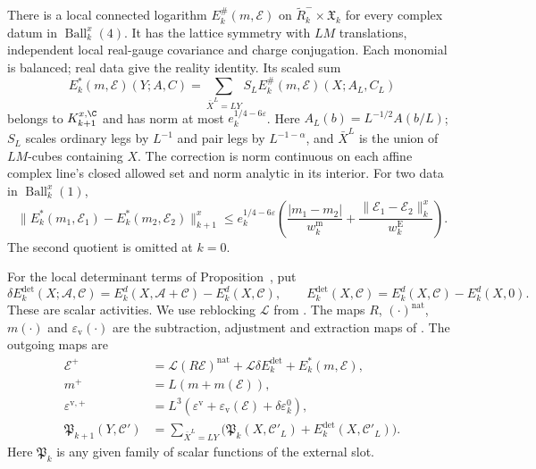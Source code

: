 \begin{theorem}
\begin{enumerate}[label=\textup{(\roman*)},leftmargin=*]
\end{enumerate}

There is a local connected logarithm $E_k^\#(m,\mathscr E)$ on
$\widetilde R_k^-\times\mathfrak X_k$ for every complex datum in
$\operatorname{Ball}_k^x(4)$. It has the lattice symmetry with
$LM$ translations, independent local real-gauge covariance and
charge conjugation. Each monomial is balanced; real data give the
reality identity. Its scaled sum
\[
 E_k^*(m,\mathscr E)(Y;A,C)
   =\sum_{\bar X^L=LY}S_LE_k^\#(m,\mathscr E)(X;A_L,C_L)
\]
belongs to $K_{k+1}^{x,\C}$ and has norm at most
$e_k^{1/4-6\varepsilon}$. Here $A_L(b)=L^{-1/2}A(b/L)$;
$S_L$ scales ordinary legs by $L^{-1}$ and pair legs by
$L^{-1-\alpha}$, and $\bar X^L$ is the union of $LM$-cubes
containing $X$. The correction is norm continuous on each affine
complex line's closed allowed set and norm analytic in its interior.
For two data in $\operatorname{Ball}_k^x(1)$,
\[
 \|E_k^*(m_1,\mathscr E_1)-E_k^*(m_2,\mathscr E_2)\|_{k+1}^x
 \le e_k^{1/4-6\varepsilon}
 \left(\frac{|m_1-m_2|}{w_k^{\mathrm m}}+
       \frac{\|\mathscr E_1-\mathscr E_2\|_k^x}{w_k^{\mathrm E}}\right).
\]
The second quotient is omitted at $k=0$.

For the local determinant terms of
Proposition~, put
\[
 \delta E_k^{\mathrm{det}}(X;\mathscr A,\mathscr C)
       =E_k^d(X,\mathscr A+\mathscr C)-E_k^d(X,\mathscr C),
 \qquad
 E_k^{\mathrm{det}}(X,\mathscr C)
       =E_k^d(X,\mathscr C)-E_k^d(X,0).
\]
These are scalar activities. We use reblocking
$\mathcal L$ from .
The maps $R$, $(\cdot)^{\mathrm{nat}}$, $m(\cdot)$ and
$\varepsilon_{\mathrm v}(\cdot)$ are the subtraction, adjustment and
extraction maps of \cite[Theorem~A]{NormalizedContraction}.
The outgoing maps are
\begin{align}
 \mathscr E^+&=\mathcal L(R\mathscr E)^{\mathrm{nat}}
                        +\mathcal L\delta E_k^{\mathrm{det}}
                        +E_k^*(m,\mathscr E), \label{eq:rgnl-full-step}\\
 m^+&=L(m+m(\mathscr E)),\\
 \varepsilon^{\mathrm v,+}
       &=L^3(\varepsilon^{\mathrm v}
                  +\varepsilon_{\mathrm v}(\mathscr E)
                                      +\delta\varepsilon_k^0),\\
 \mathfrak P_{k+1}(Y,\mathscr C')
       &=\sum_{\bar X^L=LY}
           \big(\mathfrak P_k(X,\mathscr C'_L)
                          +E_k^{\mathrm{det}}(X,\mathscr C'_L)\big).
                                      \label{eq:rgnl-external-scalar-map}
\end{align}
Here $\mathfrak P_k$ is any given family of scalar
functions of the external slot.



\end{theorem}
